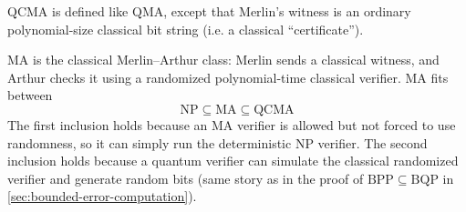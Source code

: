 \begin{definition}\label{def:qcma}
\(
\mathrm{QCMA}
\)
is defined like
\(
\mathrm{QMA}
\),
except that Merlin's witness is an ordinary polynomial-size classical bit string (i.e. a classical ``certificate'').
\end{definition}


\(
\mathrm{MA}
\)
is the classical Merlin--Arthur class:
Merlin sends a classical witness, and Arthur checks it using a randomized polynomial-time classical verifier.
MA fits between
\[
\mathrm{NP}
\subseteq
\mathrm{MA}
\subseteq
\mathrm{QCMA}
\]
The first inclusion holds because an MA verifier is allowed but not forced to use randomness, so it can simply run the deterministic NP verifier.
The second inclusion holds because a quantum verifier can simulate the classical randomized verifier and generate random bits (same story as in the proof of \(\mathrm{BPP}\subseteq\mathrm{BQP}\) in \autoref{sec:bounded-error-computation}).

\pagebreak[3]


